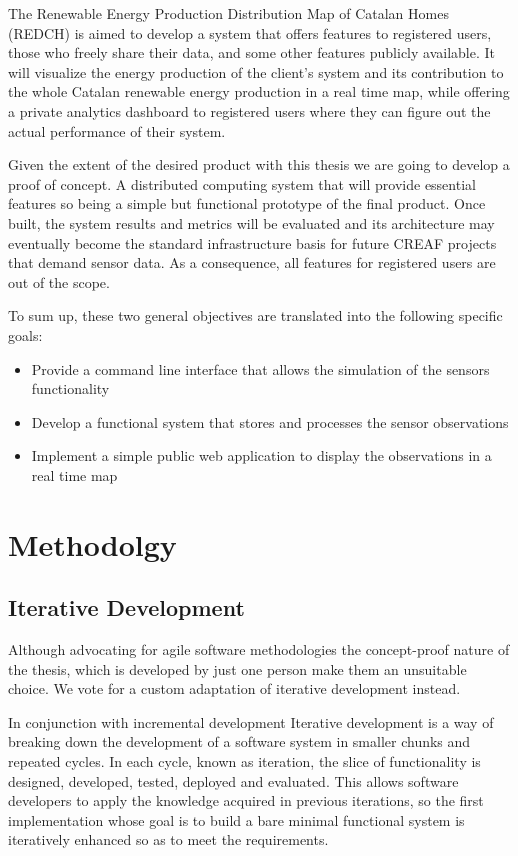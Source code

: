 The Renewable Energy Production Distribution Map of Catalan Homes (REDCH) is aimed to develop a system that offers features to registered users, those who freely share their data, and some other features publicly available. It will visualize the energy production of the client’s system and its contribution to the whole Catalan renewable energy production in a real time map, while offering a private analytics dashboard to registered users where they can figure out the actual performance of their system.

Given the extent of the desired product with this thesis we are going to develop a proof of concept. A distributed computing system that will provide essential features so being a simple but functional prototype of the final product. Once built, the system results and metrics will be evaluated and its architecture may eventually become the standard infrastructure basis for future CREAF projects that demand sensor data. As a consequence, all features for registered users are out of the scope.

To sum up, these two general objectives are translated into the following specific goals:

\begin{itemize}
	\item Provide a command line interface that allows the simulation of the sensors functionality
	\item Develop a functional system that stores and processes the sensor observations
	\item Implement a simple public web application to display the observations in a real time map
\end{itemize}

\section{Methodolgy}

\subsection{Iterative Development}

Although advocating for agile software methodologies the concept-proof nature of the thesis, which is developed by just one person make them an unsuitable choice. We vote for a custom adaptation of iterative development instead.

In conjunction with incremental development Iterative development is a way of breaking down the development of a software system in smaller chunks and repeated cycles. In each cycle, known as iteration, the slice of functionality is designed, developed, tested, deployed and evaluated. This allows software developers to apply the knowledge acquired in previous iterations, so the first implementation whose goal is to build a bare minimal functional system is iteratively enhanced so as to meet the requirements.

